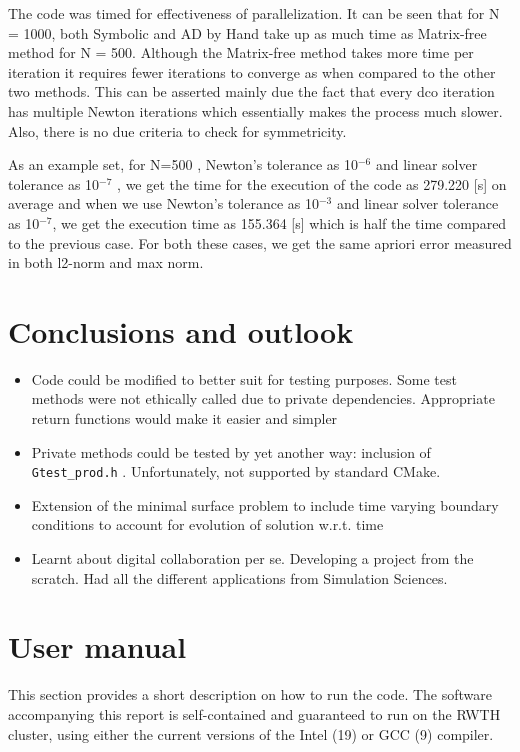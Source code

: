 \documentclass[11pt]{scrartcl}
\begin{document}
The code was timed for effectiveness of parallelization. It can be seen that for N = 1000, both Symbolic and AD by Hand take up as much time as Matrix-free method for N = 500. Although the Matrix-free method takes more time per iteration it requires fewer iterations to converge as when compared to the other two methods.
This can be asserted mainly due the fact that every dco iteration has multiple Newton iterations which essentially makes the process much slower. Also, there is no due criteria to check for symmetricity.


As an example set, for N=500 , Newton's tolerance as 10$^{-6}$ and linear solver tolerance as 10$^{-7}$ , we get the time for the execution of the code as 279.220 [s] on average and when we use Newton's tolerance as 10$^{-3}$ and linear solver tolerance as 10$^{-7}$, we get the execution time as 155.364 [s] which is half the time compared to the previous case. For both these cases, we get the same apriori error measured in both l2-norm and max norm.


\section{Conclusions and outlook}
\begin{itemize}
	\item {Code could be modified to better suit for testing purposes. Some test methods were not ethically called due to private dependencies. Appropriate return functions would make it easier and simpler}
	\item {Private methods could be tested by yet another way: inclusion of \texttt{Gtest\_prod.h} . Unfortunately, not supported by standard CMake.}
	\item {Extension of the minimal surface problem to include time varying boundary conditions to account for evolution of solution w.r.t. time}
	\item {Learnt about digital collaboration per se. Developing a project from the scratch. Had all the different applications from Simulation Sciences.}
\end{itemize}


%

\clearpage
\appendix
\section{User manual}
This section provides a short description on how to run the code. The software accompanying this report is self-contained and guaranteed to run on the RWTH cluster, using either the current versions of the Intel (19) or GCC (9) compiler.
\end{document}
